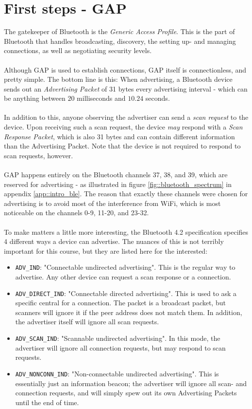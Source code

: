 \documentclass[11pt,a4paper]{article}
\begin{document}
\section{First steps - GAP}
The gatekeeper of Bluetooth is the \textit{Generic Access Profile}. This is the part of Bluetooth that handles broadcasting, discovery, the setting up- and managing connections, as well as negotiating security levels.\\
\\
Although GAP is used to establish connections, GAP itself is connectionless, and pretty simple. The bottom line is this: When advertising, a Bluetooth device sends out an \textit{Advertising Packet} of 31 bytes every advertising interval - which can be anything between $20$ milliseconds and $10.24$ seconds.\\
\\
In addition to this, anyone observing the advertiser can send a \textit{scan request} to the device. Upon receiving such a scan request, the device \textit{may} respond with a \textit{Scan Response Packet}, which is also 31 bytes and can contain different information than the Advertising Packet. Note that the device is not required to respond to scan requests, however.\\
\\
GAP happens entirely on the Bluetooth channels 37, 38, and 39, which are reserved for advertising - as illustrated in figure \ref{fig::bluetooth_spectrum} in appendix \ref{app::intro_ble}. The reason that exactly these channels were chosen for advertising is to avoid most of the interference from WiFi, which is most noticeable on the channels 0-9, 11-20, and 23-32.\\
\\
To make matters a little more interesting, the Bluetooth 4.2 specification specifies 4 different ways a device can advertise. The nuances of this is not terribly important for this course, but they are listed here for the interested:
\begin{itemize}
\item \texttt{ADV_IND}: "Connectable undirected advertising". This is the regular way to advertise. Any other device can request a scan response or a connection.
\item \texttt{ADV_DIRECT_IND}: "Connectable directed advertising". This is used to ask a specific central for a connection. The packet is a broadcast packet, but scanners will ignore it if the peer address does not match them. In addition, the advertiser itself will ignore all scan requests.
\item \texttt{ADV_SCAN_IND}: "Scannable undirected advertising". In this mode, the advertiser will ignore all connection requests, but may respond to scan requests.
\item \texttt{ADV_NONCONN_IND}: "Non-connectable undirected advertising". This is essentially just an information beacon; the advertiser will ignore all scan- and connection requests, and will simply spew out its own Advertising Packets until the end of time.
\end{itemize}
\end{document}
